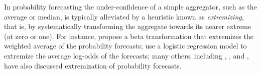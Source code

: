 \documentclass[11pt]{article}
\theoremstyle{definition}
\theoremstyle{definition}
\begin{document}
In probability forecasting the under-confidence of a simple aggregator, such as the average or median, is typically alleviated by a heuristic known as \textit{extremizing}, that is, by systematically transforming the aggregate towards its nearer extreme (at zero or one). 
For instance, \cite{Ranjan08} propose a beta transformation that extremizes the weighted average of
  the probability forecasts; \cite{satopaa} use a logistic regression model to extremize the average log-odds of the
  forecasts; many others, including \cite{baron2014two}, \cite{mellers2014psychological}, and \cite{shlomi2010subjective}, have also discussed extremization of probability forecasts.
\end{document}
